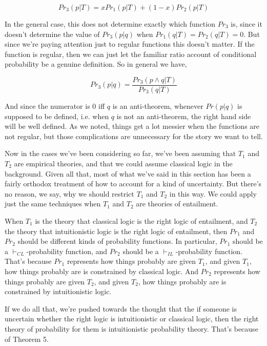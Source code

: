\begin{equation}
Pr_3(p | T) = xPr_1(p | T) + (1-x)Pr_2(p | T)
\end{equation}

\noindent In the general case, this does not determine exactly which function $Pr_3$ is, since it doesn't determine the value of $Pr_3(p | q)$ when $Pr_1(q | T) = Pr_2(q | T) = 0$. But since we're paying attention just to regular functions this doesn't matter. If the function is regular, then we can just let the familiar ratio account of conditional probability be a genuine definition. So in general we have,

\begin{equation}
Pr_3(p | q) = \frac{Pr_3(p \wedge q | T)}{Pr_3(q | T)}
\end{equation}

\noindent And since the numerator is 0 iff $q$ is an anti-theorem, whenever $Pr(p | q)$ is supposed to be defined, i.e. when $q$ is not an anti-theorem, the right hand side will be well defined. As we noted, things get a lot messier when the functions are not regular, but those complications are unnecessary for the story we want to tell.

Now in the cases we've been considering so far, we've been assuming that $T_1$ and $T_2$ are empirical theories, and that we could assume classical logic in the background. Given all that, most of what we've said in this section has been a fairly orthodox treatment of how to account for a kind of uncertainty. But there's no reason, we say, why we should restrict $T_1$ and $T_2$ in this way. We could apply just the same techniques when $T_1$ and $T_2$ are theories of entailment. 

When $T_1$ is the theory that classical logic is the right logic of entailment, and $T_2$ the theory that intuitionistic logic is the right logic of entailment, then $Pr_1$ and $Pr_2$ should be different kinds of probability functions. In particular, $Pr_1$ should be a $\vdash_{CL}$-probability function, and $Pr_2$ should be a $\vdash_{IL}$-probability function. That's because $Pr_1$ represents how things probably are given $T_1$, and given $T_1$, how things probably are is constrained by classical logic. And $Pr_2$ represents how things probably are given $T_2$, and given $T_2$, how things probably are is constrained by intuitionistic logic.

If we do all that, we're pushed towards the thought that the if someone is uncertain whether the right logic is intuitionistic or classical logic, then the right theory of probability for them is intuitionistic probability theory. That's because of Theorem 5.

